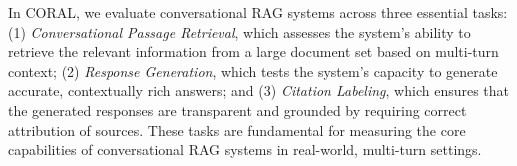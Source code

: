 \documentclass[11pt]{article}
\begin{document}
 











In CORAL, we evaluate conversational RAG systems across three essential tasks: (1) \textit{Conversational Passage Retrieval}, which assesses the system’s ability to retrieve the relevant information from a large document set based on multi-turn context; (2) \textit{Response Generation}, which tests the system’s capacity to generate accurate, contextually rich answers; and (3) \textit{Citation Labeling}, which ensures that the generated responses are transparent and grounded by requiring correct attribution of sources. These tasks are fundamental for measuring the core capabilities of conversational RAG systems in real-world, multi-turn settings.
\end{document}
